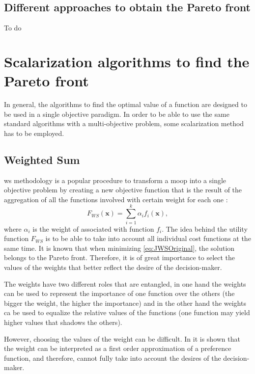 \subsection{Different approaches to obtain the Pareto front}
To do
\section{Scalarization algorithms to find the Pareto front}
\label{sec:design-methodologies}

In general, the algorithms to find the optimal value of a function are designed to be used in a single objective paradigm. In order to be able to use the same standard algorithms with a multi-objective problem, some scalarization method has to be employed.
%
\subsection{Weighted Sum}
\label{sec:WS}
\gls{ws} methodology is a popular procedure to transform a \gls{moop} into a single objective problem by creating a new objective function that is the result of the aggregation of all the functions involved with certain weight for each one \cite{Marler2004}:
%
\begin{equation}
F_{WS}(\mathbf{x}) = \sum_{i=1}^{k}\alpha_{i} {f}_{i}(\mathbf{x}),
\label{eq:JWSOriginal}
\end{equation}
%
where $\alpha_i$ is the weight of associated with function $f_i$. The idea behind the utility function $F_{WS}$ is to be able to take into account all individual cost functions at the same time. It is known that when minimizing \eqref{eq:JWSOriginal}, the solution belongs to the Pareto front. Therefore, it is of great importance to select the values of the weights that better reflect the desire of the decision-maker.

The weights have two different roles that are entangled, in one hand the weights can be used to represent the importance of one function over the others (the bigger the weight, the higher the importance) and in the other hand the weights ca be used to equalize the relative values of the functions (one function may yield higher values that shadows the others).

However, choosing the values of the weight can be difficult. In \cite{Marler2010} it is shown that the weight can be interpreted as a first order approximation of a preference function, and therefore, cannot fully take into account the desires of the decision-maker.

